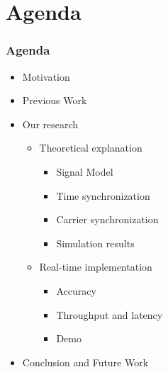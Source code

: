\section{Agenda}

\begin{frame}
  \frametitle{Agenda}
    \begin{itemize}
        \item{Motivation}
        \item{Previous Work}
        \item{Our research}
        \begin{itemize}
            \item Theoretical explanation
                \begin{itemize}
                \item Signal Model
                \item Time synchronization
                \item Carrier synchronization
                \item Simulation results
                \end{itemize}
            \item Real-time implementation
                \begin{itemize}
                \item Accuracy
                \item Throughput and latency
                \item Demo
                \end{itemize}
        \end{itemize}
        \item{Conclusion and Future Work}
    \end{itemize}
\end{frame}